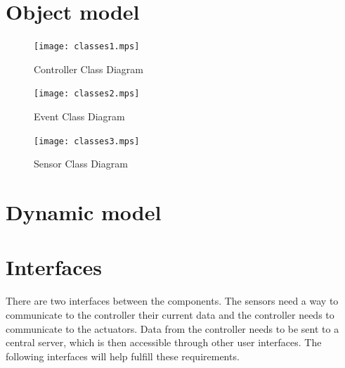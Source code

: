 \documentclass{report}
\begin{document}
\setlength{\parindent}{\originalParindent}
\setlength{\parskip}{\originalParskip}

\section{Object model}

\begin{landscape}
\begin{figure}[hp]
    \centering
        \caption{Controller Class Diagram}
        \scriptsize
        \setlength{\unitlength}{2.0em}
        \texttt{[image: classes1.mps]}
        \normalsize
    \label{fig:controller_class_diagram}
\end{figure}
\end{landscape}

\begin{landscape}
\begin{figure}[hp]
    \centering
        \caption{Event Class Diagram}
        \scriptsize
        \setlength{\unitlength}{2.0em}
        \texttt{[image: classes2.mps]}
        \normalsize
    \label{fig:event_class_diagram}
\end{figure}
\end{landscape}

\begin{landscape}
\begin{figure}[hp]
    \centering
        \caption{Sensor Class Diagram}
        \scriptsize
        \setlength{\unitlength}{2.0em}
        \texttt{[image: classes3.mps]}
        \normalsize
    \label{fig:sensor_class_diagram}
\end{figure}
\end{landscape}




\section{Dynamic model}


\section{Interfaces}
There are two interfaces between the components. The sensors need a way to
communicate to the controller their current data and the controller needs to
communicate to the actuators. Data from the controller needs to be sent to a
central server, which is then accessible through other user interfaces. The following
interfaces will help fulfill these requirements.
\end{document}
